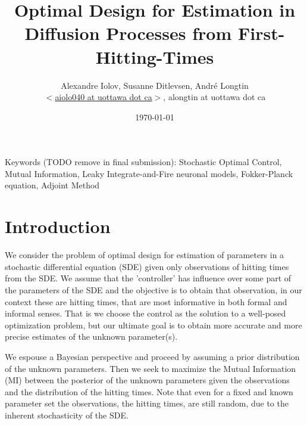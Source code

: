 \documentclass{article}
\begin{document}
\title{Optimal Design for Estimation in Diffusion Processes from
First-Hitting-Times}
\author{Alexandre Iolov, Susanne Ditlevsen, Andr\'e Longtin  \\
$<$\href{mailto:aiolo040@uottawa.ca}
		{aiolo040 at uottawa dot ca}$>$, alongtin at uottawa dot ca}

\date{\today}

\maketitle  

 
Keywords (TODO remove in final submission): Stochastic Optimal
Control, Mutual Information, Leaky Integrate-and-Fire neuronal models,
Fokker-Planck equation, Adjoint Method


\tableofcontents

\listoftables  

\listoffigures

\section{Introduction}
We consider the problem of optimal design for estimation of parameters in a
stochastic differential equation (SDE) given only observations of hitting times
from the SDE. We assume that the 'controller' has influence over some part of
the parameters of the SDE and the objective is to obtain that observation, in
our context these are hitting times, that are most informative in both formal
and informal senses. That is we choose the control as the solution to a
well-posed optimization problem, but our ultimate goal is to obtain more
accurate and more precise estimates of the unknown parameter(s).

We espouse a Bayesian perspective and proceed by assuming a prior
distribution of the unknown parameters. Then we seek to maximize the Mutual
Information (MI) between the posterior of the unknown parameters given the
observations and the distribution of the hitting times. Note that even for a
fixed and known parameter set the observations, the hitting times,
are still random, due to the inherent stochasticity of the SDE. 
\end{document}
